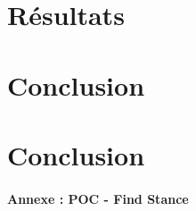 \documentclass[a4paper,12pt]{article}
\begin{document}
\newpage
\part{Résultats}
	


\newpage
\part{Conclusion}
	

\newpage
\part{Conclusion}
	\subsection{Annexe : POC - Find Stance}
	\label{annexe-stance-detection}	%
	
\end{document}
